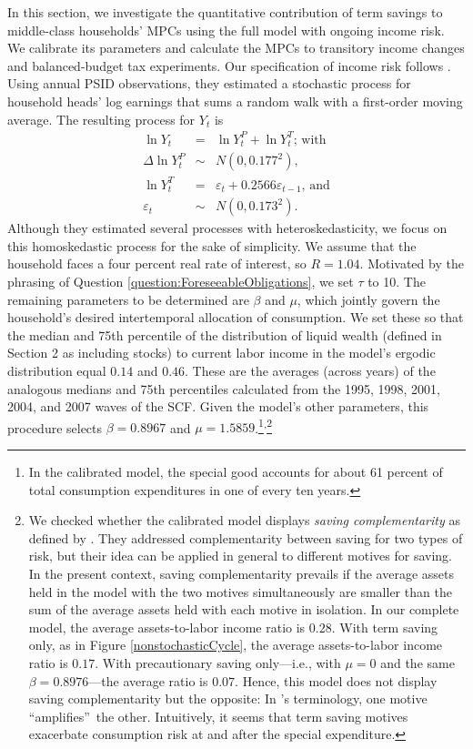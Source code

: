 \documentclass[fleqccn,12pt]{article}
\begin{document}
In this section, we investigate the quantitative contribution of term savings to middle-class households' MPCs using the full model with ongoing income risk. We calibrate its parameters and calculate the MPCs to transitory income changes and balanced-budget tax experiments. Our specification of income risk follows \cite{ecta2004MeghirPistaferri}. Using annual PSID observations, they estimated a stochastic process for household heads' log earnings that sums a random walk with a first-order moving average. The resulting process for $Y_t$ is
\begin{eqnarray*}
\ln Y_{t} &=&\ln Y_{t}^{P}+\ln Y_{t}^{T}\textrm{; with} \\
\Delta \ln Y_{t}^{P} &\sim &N(0,0.177^{2}), \\
\ln Y_{t}^{T} &=&\varepsilon _
{t}+0.2566\varepsilon _{t-1}\textrm{, and} \\
\varepsilon _{t} &\sim &N(0,0.173^{2}).
\end{eqnarray*}
Although they estimated several processes with heteroskedasticity, we focus on this homoskedastic process for the sake of simplicity. We assume that the household faces a four percent real rate of interest, so $R=1.04$. Motivated by the phrasing of Question \ref{question:ForeseeableObligations}, we set $\tau$ to 10. The remaining parameters to be determined are $\beta$ and $\mu$, which jointly govern the household's desired intertemporal allocation of consumption. We set these so that the median and 75th percentile of the distribution of liquid wealth (defined in Section 2 as including stocks) to current labor income in the model's ergodic distribution equal $0.14$ and $0.46$. These are the averages (across years) of the analogous medians and 75th percentiles calculated from the 1995, 1998, 2001, 2004, and 2007 waves of the SCF. Given the model's other parameters, this procedure selects $\beta=0.8967$ and $\mu=1.5859$.\footnote{In the calibrated model, the special good accounts for about 61 percent of total consumption expenditures in one of every ten years.}\textsuperscript{,}\footnote{\label{savingComplementarity}We checked whether the calibrated model displays \emph{saving complementarity} as defined by \citet*{wp2014BlundellEtheridgeStoker}. They addressed complementarity between saving for two types of risk, but their idea can be applied in general to different motives for saving. In the present context, saving complementarity prevails if the average assets held in the model with the two motives simultaneously are smaller than the sum of the average assets held with each motive in isolation. In our complete model, the average assets-to-labor income ratio is $0.28.$ With term saving only, as in Figure \ref{nonstochasticCycle}, the average assets-to-labor income ratio is $0.17$. With precautionary saving only---i.e., with $\mu=0$ and the same $\beta=0.8976$---the average ratio is $0.07.$ Hence, this model does not display saving complementarity but the opposite: In \citeauthor*{wp2014BlundellEtheridgeStoker}'s terminology, one motive \textquotedblleft amplifies\textquotedblright\ the other. Intuitively, it seems that term saving motives
exacerbate consumption risk at and after the special expenditure.}
\end{document}
